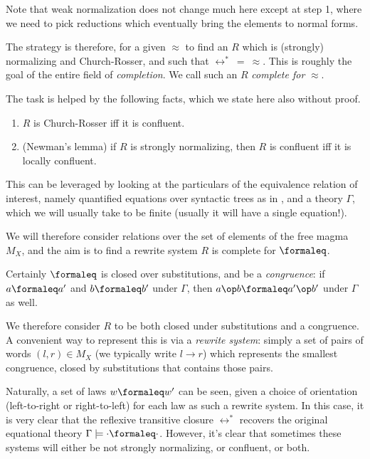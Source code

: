 Note that weak normalization does not change much here except at step 1, where we need to pick reductions which eventually bring the elements to normal forms.

The strategy is therefore, for a given $\approx$ to find an $R$ which is (strongly) normalizing and Church-Rosser, and such that $\leftrightarrow^*\ =\ \approx$. This is roughly the goal of the entire field of \emph{completion}. We call such an $R$ \emph{complete for} $\approx$.

The task is helped by the following facts, which we state here also without proof.

\begin{theorem}
  \begin{enumerate}
    \item $R$ is Church-Rosser iff it is confluent.
    \item (Newman's lemma) if $R$ is strongly normalizing, then $R$ is confluent iff it is locally confluent.
  \end{enumerate}
\end{theorem}

This can be leveraged by looking at the particulars of the equivalence relation of interest, namely quantified equations over syntactic trees as in , and a theory $\Gamma$, which we will usually take to be finite (usually it will have a single equation!).

We will therefore consider relations over the set of elements of the free magma $M_{X}$, and the aim is to find a rewrite system $R$ is complete for $\formaleq$.

Certainly $\formaleq$ is closed over substitutions, and be a \emph{congruence}: if $a\formaleq a'$ and $b\formaleq b'$ under $\Gamma$, then $a\op b\formaleq a'\op b'$ under $\Gamma$ as well.

We therefore consider $R$ to be both closed under substitutions and a congruence. A convenient way to represent this is via a \emph{rewrite system}: simply a set of pairs of words $(l, r) \in M_{X}$ (we typically write $l\rightarrow r$) which represents the smallest congruence, closed by substitutions that contains those pairs.

Naturally, a set of laws $w \formaleq w'$ can be seen, given a choice of orientation (left-to-right or right-to-left) for each law as such a rewrite system. In this case, it is very clear that the reflexive transitive closure $\leftrightarrow^*$ recovers the original equational theory $\Gamma\models \cdot\formaleq\cdot$. However, it's clear that sometimes these systems will either be not strongly normalizing, or confluent, or both.

